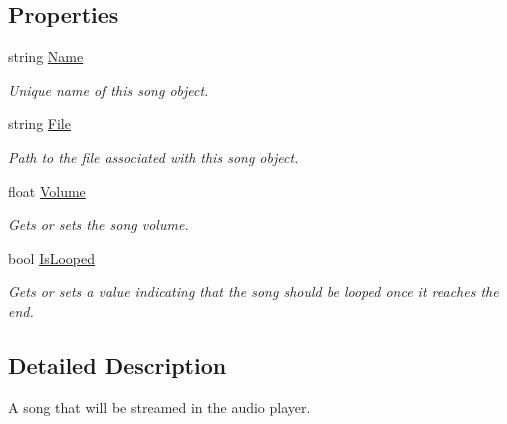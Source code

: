 \subsection*{Properties}
\begin{DoxyCompactItemize}
\item 
string \hyperlink{interface_tri_devs_1_1_tri_engine2_d_1_1_audio_1_1_i_song_ad14836f818a4e0d63c9a341c2159250a}{Name}
\begin{DoxyCompactList}\small\item\em Unique name of this song object. \end{DoxyCompactList}\item 
string \hyperlink{interface_tri_devs_1_1_tri_engine2_d_1_1_audio_1_1_i_song_a5610c3ab21ec36403c5a632a24a57c54}{File}
\begin{DoxyCompactList}\small\item\em Path to the file associated with this song object. \end{DoxyCompactList}\item 
float \hyperlink{interface_tri_devs_1_1_tri_engine2_d_1_1_audio_1_1_i_song_aaf0addd47d248155a74d9cb9eca8fa4b}{Volume}
\begin{DoxyCompactList}\small\item\em Gets or sets the song volume. \end{DoxyCompactList}\item 
bool \hyperlink{interface_tri_devs_1_1_tri_engine2_d_1_1_audio_1_1_i_song_a6a5eeb5f1f6418fda045baeba034e734}{Is\-Looped}
\begin{DoxyCompactList}\small\item\em Gets or sets a value indicating that the song should be looped once it reaches the end. \end{DoxyCompactList}\end{DoxyCompactItemize}


\subsection{Detailed Description}
A song that will be streamed in the audio player. 



